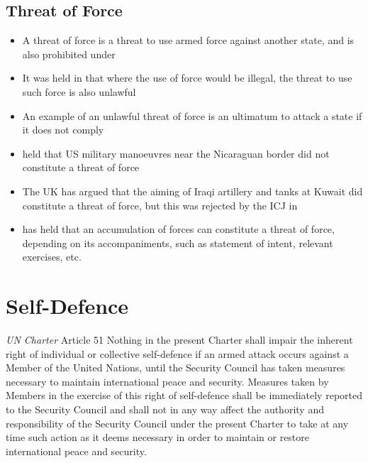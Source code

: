 \subsection{Threat of Force}
\begin{itemize}
    \item A threat of force is a threat to use armed force against another state, and is also prohibited under 
    \item It was held in  that where the use of force would be illegal, the threat to use such force is also unlawful
    \item An example of an unlawful threat of force is an ultimatum to attack a state if it does not comply
    \item {} held that US military manoeuvres near the Nicaraguan border did not constitute a threat of force
    \item The UK has argued that the aiming of Iraqi artillery and tanks at Kuwait did constitute a threat of force, but this was rejected by the ICJ in 
    \item {} has held that an accumulation of forces can constitute a threat of force, depending on its accompaniments, such as statement of intent, relevant exercises, etc.
\end{itemize}

\section{Self-Defence}

\begin{conventiondetails}{\textit{UN Charter} Article 51}
    \flushleft
    Nothing in the present Charter shall impair the inherent right of individual or collective self-defence if an armed attack occurs against a Member of the United Nations, until the Security Council has taken measures necessary to maintain international peace and security. Measures taken by Members in the exercise of this right of self-defence shall be immediately reported to the Security Council and shall not in any way affect the authority and responsibility of the Security Council under the present Charter to take at any time such action as it deems necessary in order to maintain or restore international peace and security.
\end{conventiondetails}

